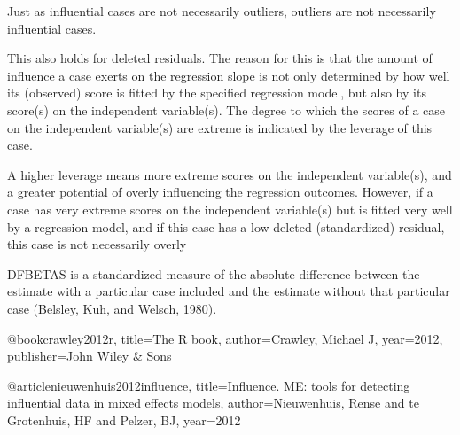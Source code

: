 Just as influential cases are not necessarily outliers, outliers are not necessarily influential cases. 

This also holds for deleted residuals. The reason for this is that the amount of influence a case exerts on the regression slope is not only determined by how well its (observed) score is fitted by the specified
regression model, but also by its score(s) on the independent variable(s). The degree to which the scores of a case on the independent variable(s) are extreme is indicated by the leverage of this case. 

A higher leverage means more extreme scores on the independent variable(s), and a greater potential of
overly influencing the regression outcomes. However, if a case has very extreme scores on the independent
variable(s) but is fitted very well by a regression model, and if this case has a low deleted (standardized)
residual, this case is not necessarily overly

DFBETAS is a standardized measure of the absolute difference between the estimate with a particular
case included and the estimate without that particular case (Belsley, Kuh, and Welsch, 1980).




@book{crawley2012r,
  title={The R book},
  author={Crawley, Michael J},
  year={2012},
  publisher={John Wiley \& Sons}
}

@article{nieuwenhuis2012influence,
  title={Influence. ME: tools for detecting influential data in mixed effects models},
  author={Nieuwenhuis, Rense and te Grotenhuis, HF and Pelzer, BJ},
  year={2012}
}
